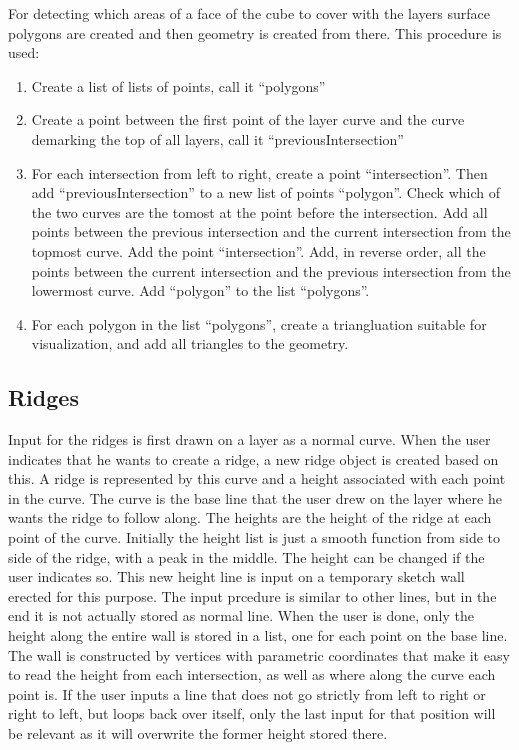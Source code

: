\documentclass[a4paper,12pt]{report}
\begin{document}
For detecting which areas of a face of the cube to cover with the layers surface polygons are created and then geometry is created from there. This procedure is used:
\begin{enumerate}
 \item Create a list of lists of points, call it ``polygons''
 \item Create a point between the first point of the layer curve and the curve demarking the top of all layers, call it ``previousIntersection''
 \item For each intersection from left to right, create a point ``intersection''. Then add ``previousIntersection'' to a new list of points ``polygon''. Check which of the two curves are the tomost at the point before the intersection. Add all points between the previous intersection and the current intersection from the topmost curve. Add the point ``intersection''. Add, in reverse order, all the points between the current intersection and the previous intersection from the lowermost curve. Add ``polygon'' to the list ``polygons''.
 \item For each polygon in the list ``polygons'', create a triangluation suitable for visualization, and add all triangles to the geometry.
\end{enumerate}

\subsection{Ridges}
Input for the ridges is first drawn on a layer as a normal curve. When the user indicates that he wants to create a ridge, a new ridge object is created based on this. A ridge is represented by this curve and a height associated with each point in the curve. The curve is the base line that the user drew on the layer where he wants the ridge to follow along. The heights are the height of the ridge at each point of the curve. Initially the height list is just a smooth function from side to side of the ridge, with a peak in the middle. The height can be changed if the user indicates so. This new height line is input on a temporary sketch wall erected for this purpose. The input prcedure is similar to other lines, but in the end it is not actually stored as normal line. When the user is done, only the height along the entire wall is stored in a list, one for each point on the base line. The wall is constructed by vertices with parametric coordinates that make it easy to read the height from each intersection, as 
well as where along the curve each point is. If the user inputs a line that does not go strictly from left to right or right to left, but loops back over itself, only the last input for that position will be relevant as it will overwrite the former height stored there.
\end{document}
